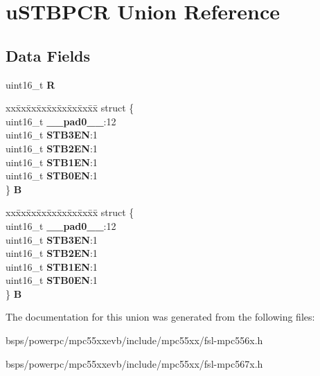 \hypertarget{unionuSTBPCR}{}\section{u\+S\+T\+B\+P\+CR Union Reference}
\label{unionuSTBPCR}
\subsection*{Data Fields}
\begin{DoxyCompactItemize}
\item 
\mbox{\label{unionuSTBPCR_a38b0a162a59a34f932b88eebcb0dd5ce}} 
uint16\+\_\+t {\bfseries R}
\item 
\mbox{\label{unionuSTBPCR_a9ad9273f6683b81c97d08dc6908c0b33}} 
\begin{tabbing}
xx\=xx\=xx\=xx\=xx\=xx\=xx\=xx\=xx\=\kill
struct \{\\
\>uint16\_t {\bfseries \_\_pad0\_\_}:12\\
\>uint16\_t {\bfseries STB3EN}:1\\
\>uint16\_t {\bfseries STB2EN}:1\\
\>uint16\_t {\bfseries STB1EN}:1\\
\>uint16\_t {\bfseries STB0EN}:1\\
\} {\bfseries B}\\

\end{tabbing}\item 
\mbox{\label{unionuSTBPCR_a5a89d073c827199dfd1ab0aca27ab769}} 
\begin{tabbing}
xx\=xx\=xx\=xx\=xx\=xx\=xx\=xx\=xx\=\kill
struct \{\\
\>uint16\_t {\bfseries \_\_pad0\_\_}:12\\
\>uint16\_t {\bfseries STB3EN}:1\\
\>uint16\_t {\bfseries STB2EN}:1\\
\>uint16\_t {\bfseries STB1EN}:1\\
\>uint16\_t {\bfseries STB0EN}:1\\
\} {\bfseries B}\\

\end{tabbing}\end{DoxyCompactItemize}


The documentation for this union was generated from the following files\+:\begin{DoxyCompactItemize}
\item 
bsps/powerpc/mpc55xxevb/include/mpc55xx/fsl-\/mpc556x.\+h\item 
bsps/powerpc/mpc55xxevb/include/mpc55xx/fsl-\/mpc567x.\+h\end{DoxyCompactItemize}
